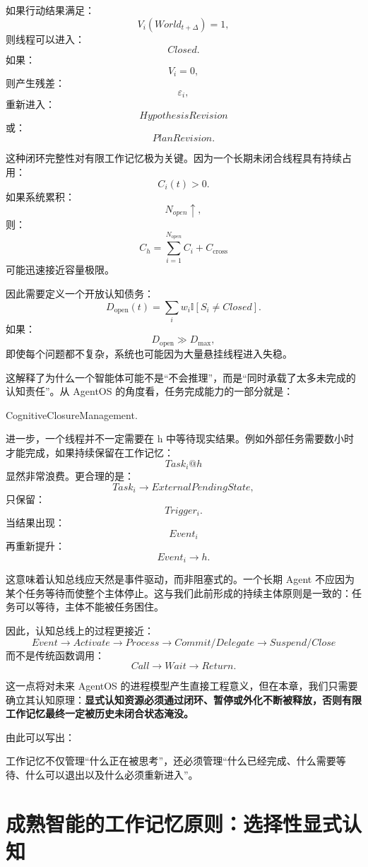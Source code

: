如果行动结果满足：
\[
V_i(World_{t+\Delta})=1,
\]
则线程可以进入：
\[
Closed.
\]
如果：
\[
V_i=0,
\]
则产生残差：
\[
\varepsilon_i,
\]
重新进入：
\[
HypothesisRevision
\]
或：
\[
PlanRevision.
\]

这种闭环完整性对有限工作记忆极为关键。因为一个长期未闭合线程具有持续占用：
\[
C_i(t)>0.
\]
如果系统累积：
\[
N_{open}\uparrow,
\]
则：
\[
C_h
=
\sum_{i=1}^{N_{open}}C_i
+
C_{\mathrm{cross}}
\]
可能迅速接近容量极限。

因此需要定义一个开放认知债务：
\[
D_{\mathrm{open}}(t)
=
\sum_i
w_i
\mathbb I[S_i\neq Closed].
\]
如果：
\[
D_{\mathrm{open}}\gg D_{\max},
\]
即使每个问题都不复杂，系统也可能因为大量悬挂线程进入失稳。

这解释了为什么一个智能体可能不是“不会推理”，而是“同时承载了太多未完成的认知责任”。从 AgentOS 的角度看，任务完成能力的一部分就是：
\begin{statementbox}
CognitiveClosureManagement.
\end{statementbox}

进一步，一个线程并不一定需要在 h 中等待现实结果。例如外部任务需要数小时才能完成，如果持续保留在工作记忆：
\[
Task_i@h
\]
显然非常浪费。更合理的是：
\[
Task_i
\rightarrow
ExternalPendingState,
\]
只保留：
\[
Trigger_i.
\]
当结果出现：
\[
Event_i
\]
再重新提升：
\[
Event_i\rightarrow h.
\]

这意味着认知总线应天然是事件驱动，而非阻塞式的。一个长期 Agent 不应因为某个任务等待而使整个主体停止。这与我们此前形成的持续主体原则是一致的：任务可以等待，主体不能被任务困住。

因此，认知总线上的过程更接近：
\[
Event
\rightarrow
Activate
\rightarrow
Process
\rightarrow
Commit/Delegate
\rightarrow
Suspend/Close
\]
而不是传统函数调用：
\[
Call
\rightarrow
Wait
\rightarrow
Return.
\]

这一点将对未来 AgentOS 的进程模型产生直接工程意义，但在本章，我们只需要确立其认知原理：\textbf{显式认知资源必须通过闭环、暂停或外化不断被释放，否则有限工作记忆最终一定被历史未闭合状态淹没。}

由此可以写出：
\begin{statementbox}
工作记忆不仅管理“什么正在被思考”，还必须管理“什么已经完成、什么需要等待、什么可以退出以及什么必须重新进入”。
\end{statementbox}

\section{成熟智能的工作记忆原则：选择性显式认知}

